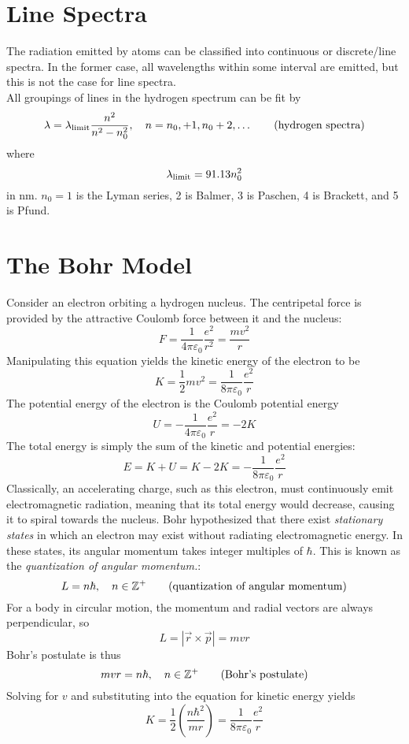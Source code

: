 \documentclass{subfiles}
\begin{document}
	\section{Line Spectra}
		The radiation emitted by atoms can be classified into continuous or discrete/line spectra. In the former case, all wavelengths within some interval are emitted, but this is not the case for line spectra. \\
		All groupings of lines in the hydrogen spectrum can be fit by
			\[
				\lambda = \lambda_{\text{limit}}\frac{n^2}{n^2 - n_0^2}, \quad 
				n = n_0, + 1, n_0 + 2, \ldots
					\tag{hydrogen spectra}	
			\]
			where
			\[\lambda_{\text{limit}} = 91.13n_0^2\]
			in nm.
			\(n_0 = 1\) is the Lyman series, 2 is Balmer, 3 is Paschen, 4 is Brackett, and 5 is Pfund.
	\section{The Bohr Model}
		Consider an electron orbiting a hydrogen nucleus. The centripetal force is provided by the attractive Coulomb force between it and the nucleus:
			\[
				F = \frac{1}{4\pi\varepsilon_0}\frac{e^2}{r^2}
					= \frac{mv^2}{r}
			\]
			Manipulating this equation yields the kinetic energy of the electron to be
			\[
				K = \frac{1}{2}mv^2
					= \frac{1}{8\pi\varepsilon_0}\frac{e^2}{r}
			\]
			The potential energy of the electron is the Coulomb potential energy
			\[
				U = -\frac{1}{4\pi\varepsilon_0}\frac{e^2}{r}
					= -2K
			\]
			The total energy is simply the sum of the kinetic and potential energies:
			\[
				E = K + U
					= K - 2K
					= -\frac{1}{8\pi\varepsilon_0}\frac{e^2}{r}
			\]
			Classically, an accelerating charge, such as this electron, must continuously emit electromagnetic radiation, meaning that its total energy would decrease, causing it to spiral towards the nucleus. Bohr hypothesized that there exist \textit{stationary states} in which an electron may exist without radiating electromagnetic energy. In these states, its angular momentum takes integer multiples of \(\hbar\). This is known as the \textit{quantization of angular momentum.}:
			\[
				L = n\hbar
					, \quad n \in \mathbb{Z}^+
					\tag{quantization of angular momentum}
			\]
			For a body in circular motion, the momentum and radial vectors are always perpendicular, so
			\[
				L = |\vec{r} \times \vec{p}| = mvr
			\]
			Bohr's postulate is thus
			\[
				mvr = n\hbar
					, \quad n \in \mathbb{Z}^+
					\tag{Bohr's postulate}
			\]
			Solving for \(v\) and substituting into the equation for kinetic energy yields
			\[
				K = \frac{1}{2}\left(\frac{n\hbar^2}{mr}\right)
					= \frac{1}{8\pi\varepsilon_0}\frac{e^2}{r}
			\]
\end{document}
